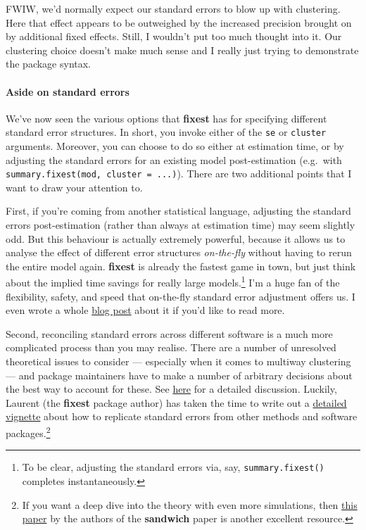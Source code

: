 \documentclass[
]{article}
\begin{document}
FWIW, we'd normally expect our standard errors to blow up with
clustering. Here that effect appears to be outweighed by the increased
precision brought on by additional fixed effects. Still, I wouldn't put
too much thought into it. Our clustering choice doesn't make much sense
and I really just trying to demonstrate the package syntax.

\hypertarget{aside-on-standard-errors}{%
\paragraph{Aside on standard errors}\label{aside-on-standard-errors}}

We've now seen the various options that \textbf{fixest} has for
specifying different standard error structures. In short, you invoke
either of the \texttt{se} or \texttt{cluster} arguments. Moreover, you
can choose to do so either at estimation time, or by adjusting the
standard errors for an existing model post-estimation (e.g.~with
\texttt{summary.fixest(mod,\ cluster\ =\ ...)}). There are two
additional points that I want to draw your attention to.

First, if you're coming from another statistical language, adjusting the
standard errors post-estimation (rather than always at estimation time)
may seem slightly odd. But this behaviour is actually extremely
powerful, because it allows us to analyse the effect of different error
structures \emph{on-the-fly} without having to rerun the entire model
again. \textbf{fixest} is already the fastest game in town, but just
think about the implied time savings for really large models.\footnote{To
  be clear, adjusting the standard errors via, say,
  \texttt{summary.fixest()} completes instantaneously.} I'm a huge fan
of the flexibility, safety, and speed that on-the-fly standard error
adjustment offers us. I even wrote a whole
\href{https://grantmcdermott.com/better-way-adjust-SEs/}{blog post}
about it if you'd like to read more.

Second, reconciling standard errors across different software is a much
more complicated process than you may realise. There are a number of
unresolved theoretical issues to consider --- especially when it comes
to multiway clustering --- and package maintainers have to make a number
of arbitrary decisions about the best way to account for these. See
\href{https://github.com/sgaure/lfe/issues/1\#issuecomment-530643808}{here}
for a detailed discussion. Luckily, Laurent (the \textbf{fixest} package
author) has taken the time to write out a
\href{https://lrberge.github.io/fixest/articles/standard_errors.html}{detailed
vignette} about how to replicate standard errors from other methods and
software packages.\footnote{If you want a deep dive into the theory with
  even more simulations, then
  \href{http://sandwich.r-forge.r-project.org/articles/jss_2020.html}{this
  paper} by the authors of the \textbf{sandwich} paper is another
  excellent resource.}
\end{document}
